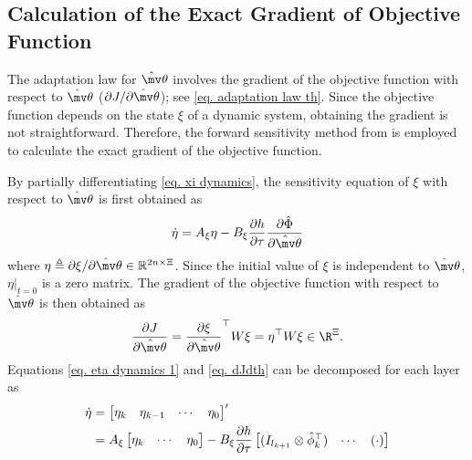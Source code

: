 \documentclass[lettersize,journal]{IEEEtran}
\newcommand*{\wth}{\mv\theta}
\begin{document}
\subsection{Calculation of the Exact Gradient of Objective Function}

The adaptation law for $\hat\wth$ involves the gradient of the objective function with respect to $\hat\wth$ (\ie ${\partial J/\partial \hat\wth}$); see \eqref{eq. adaptation law th}. Since the objective function depends on the state $\xi$ of a dynamic system, obtaining the gradient is not straightforward. Therefore, the forward sensitivity method from \cite{RN12} is employed to calculate the exact gradient of the objective function. 

By partially differentiating \eqref{eq. xi dynamics}, the sensitivity equation of $\xi$ with respect to $\hat\wth$ is first obtained as
\begin{equation}
    \dot\eta = A_\xi\eta - B_\xi{\partial h\over\partial \tau}{\partial\hat\Phi\over\partial\hat\wth}
    \label{eq. eta dynamics 1}
\end{equation}
where $\eta \triangleq \partial \xi/\partial \hat\wth\in\mathbb R^{2n\times \Xi}$.
Since the initial value of $\xi$ is independent to $\hat\wth$, $\eta|_{t=0}$ is a zero matrix. The gradient of the objective function with respect to $\hat\wth$ is then obtained as 
\begin{equation}
   {\partial J\over\partial \hat\wth} =  {\partial \xi\over \partial \hat\wth}^\top  W\xi=\eta^\top  W\xi\in\R^\Xi.
   \label{eq. dJdth}
\end{equation}
Equations \eqref{eq. eta dynamics 1} and \eqref{eq. dJdth} can be decomposed for each layer as 
\begin{equation}
    \begin{aligned}
        \dot \eta&= 
        \begin{bmatrix}
            \eta_k&
            \eta_{k-1}&
            \cdots &
            \eta_0
        \end{bmatrix}'
        \\
        &=A_\xi
        \begin{bmatrix}
            \eta_k&
            \cdots &
            \eta_0
        \end{bmatrix}
        -B_\xi{\partial h\over\partial \tau}
        \begin{bmatrix}
            (I_{l_{k+1}}\otimes \hat\phi_{k}^\top  )&
        \cdots&
        (\cdot)
        \end{bmatrix}
    \end{aligned}
    \label{eq. eta dynamics}
\end{equation}
\end{document}
